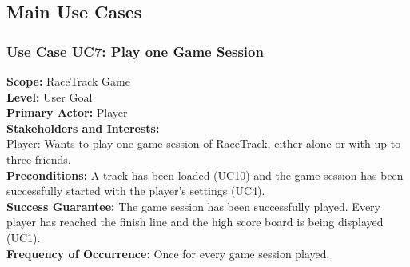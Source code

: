 	\subsection{Main Use Cases}
		
		\subsubsection{Use Case UC7: Play one Game Session}
			\textbf{Scope:} RaceTrack Game \\
			\textbf{Level:} User Goal \\
			\textbf{Primary Actor:} Player \\
			\textbf{Stakeholders and Interests:} \\
			Player: Wants to play one game session of RaceTrack, either alone or with up to three friends. \\
			\textbf{Preconditions:} A track has been loaded (UC10) and the game session has been successfully started with the player's settings (UC4). \\
			\textbf{Success Guarantee:} The game session has been successfully played. Every player has reached the finish line and the high score board is being displayed (UC1). \\
			\textbf{Frequency of Occurrence:} Once for every game session played.
			\newline

